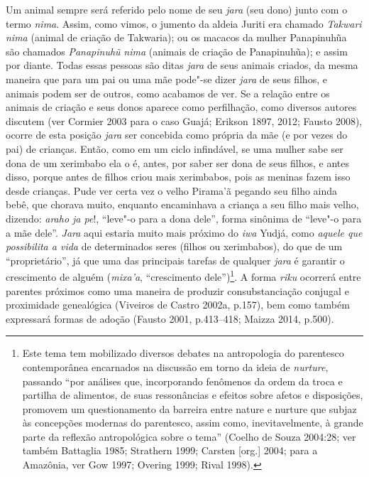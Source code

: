 Um animal sempre será referido pelo nome de seu \emph{jara} (seu dono)
junto com o termo \emph{nima}. Assim, como vimos, o jumento da aldeia
Juriti era chamado \emph{Takwari} \emph{nima} (animal de criação de
Takwaria); ou os macacos da mulher Panapinuhũa são chamados
\emph{Panapinuhũ} \emph{nima} (animais de criação de Panapinuhũa); e
assim por diante. Todas essas pessoas são ditas \emph{jara} de seus
animais criados, da mesma maneira que para um pai ou uma mãe pode"-se
dizer \emph{jara} de seus filhos, e animais podem ser de outros, como
acabamos de ver. Se a relação entre os animais de criação e seus donos
aparece como perfilhação, como diversos autores discutem (ver Cormier
2003 para o caso Guajá; Erikson 1897, 2012; Fausto 2008), ocorre de esta
posição \emph{jara} ser concebida como própria da mãe (e por vezes do
pai) de crianças. Então, como em um ciclo infindável, se uma mulher sabe
ser dona de um xerimbabo ela o é, antes, por saber ser dona de seus
filhos, e antes disso, porque antes de filhos criou mais xerimbabos,
pois as meninas fazem isso desde crianças. Pude ver certa vez o velho
Pirama'ã pegando seu filho ainda bebê, que chorava muito, enquanto
encaminhava a criança a seu filho mais velho, dizendo: \emph{araho ja
pe}!, ``leve"-o para a dona dele'', forma sinônima de ``leve"-o para a mãe
dele''. \emph{Jara} aqui estaria muito mais próximo do \emph{iwa} Yudjá,
como \emph{aquele que possibilita a vida} de determinados seres (filhos
ou xerimbabos), do que de um ``proprietário'', já que uma das principais
tarefas de qualquer \emph{jara} é garantir o crescimento de alguém
(\emph{mixa'a}, ``crescimento dele'')\footnote{Este tema tem mobilizado
  diversos debates na antropologia do parentesco contemporânea
  encarnados na discussão em torno da ideia de \emph{nurture}, passando
  ``por análises que, incorporando fenômenos da ordem da troca e partilha
      de alimentos, de suas ressonâncias e efeitos sobre afetos e
      disposições, promovem um questionamento da barreira entre nature e
      nurture que subjaz às concepções modernas do parentesco, assim como,
      inevitavelmente, à grande parte da reflexão antropológica sobre o
      tema'' (Coelho de Souza 2004:28; ver também Battaglia 1985; Strathern
  1999; Carsten {[}org.{]} 2004; para a Amazônia, ver Gow 1997; Overing
  1999; Rival 1998).}. A forma \emph{riku} ocorrerá entre parentes
próximos como uma maneira de produzir consubstanciação conjugal e
proximidade genealógica (Viveiros de Castro 2002a, p.157), bem como
também expressará formas de adoção (Fausto 2001, p.413--418; Maizza 2014,
p.500).

